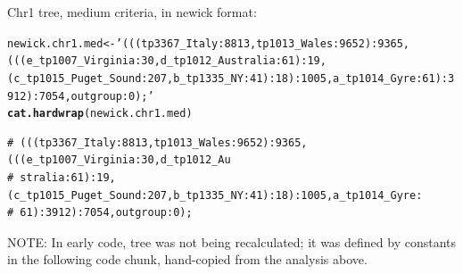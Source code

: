 \documentclass{article}\usepackage[]{graphicx}\usepackage[]{color}
\makeatletter
\newcommand{\hlstr}[1]{\textcolor[rgb]{0.192,0.494,0.8}{#1}}%
\newcommand{\hlstd}[1]{\textcolor[rgb]{0.345,0.345,0.345}{#1}}%
\newcommand{\hlkwb}[1]{\textcolor[rgb]{0.69,0.353,0.396}{#1}}%
\newcommand{\hlkwd}[1]{\textcolor[rgb]{0.737,0.353,0.396}{\textbf{#1}}}%
\newenvironment{kframe}{%
 \def\at@end@of@kframe{}%
 \ifinner\ifhmode%
  \def\at@end@of@kframe{\end{minipage}}%
  \begin{minipage}{\columnwidth}%
 \fi\fi%
 \def\FrameCommand##1{\hskip\@totalleftmargin \hskip-\fboxsep
 \colorbox{shadecolor}{##1}\hskip-\fboxsep
     \hskip-\linewidth \hskip-\@totalleftmargin \hskip\columnwidth}%
 \MakeFramed {\advance\hsize-\width
   \@totalleftmargin\z@ \linewidth\hsize
   \@setminipage}}%
 {\par\unskip\endMakeFramed%
 \at@end@of@kframe}
\newenvironment{knitrout}{}{} %
\makeatother
\begin{document}
Chr1 tree, medium criteria, in newick format:

\begin{knitrout}\footnotesize
{}\color{fgcolor}\begin{kframe}
\begin{alltt}
\hlstd{newick.chr1.med} \hlkwb{<-} \hlstr{'(((tp3367_Italy:8813,tp1013_Wales:9652):9365,(((e_tp1007_Virginia:30,d_tp1012_Australia:61):19,(c_tp1015_Puget_Sound:207,b_tp1335_NY:41):18):1005,a_tp1014_Gyre:61):3912):7054,outgroup:0);'}
\hlkwd{cat.hardwrap}\hlstd{(newick.chr1.med)}
\end{alltt}
\begin{verbatim}
# (((tp3367_Italy:8813,tp1013_Wales:9652):9365,(((e_tp1007_Virginia:30,d_tp1012_Au 
# stralia:61):19,(c_tp1015_Puget_Sound:207,b_tp1335_NY:41):18):1005,a_tp1014_Gyre: 
# 61):3912):7054,outgroup:0);
\end{verbatim}
\end{kframe}
\end{knitrout}

NOTE: In early code, tree was not being recalculated; it was defined by constants in the following 
code chunk, hand-copied from the analysis above.  
\end{document}
